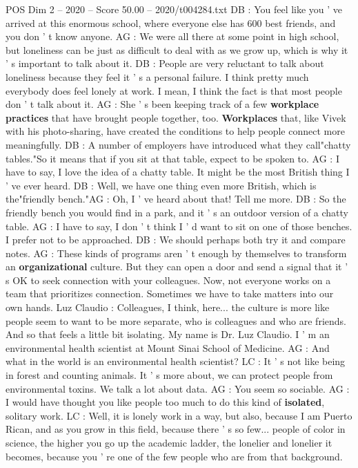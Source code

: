 \begin{textsample}{POS Dim 2 – 2020 – Score 50.00 – 2020/t004284.txt}
DB : You feel like you ' ve arrived at this enormous school, where everyone else has 600 best friends, and you don ' t know anyone.
AG : We were all there at some point in high school, but loneliness can be just as difficult to deal with as we grow up, which is why it ' s important to talk about it.
DB : People are very reluctant to talk about loneliness because they feel it ' s a personal failure.
I think pretty much everybody does feel lonely at work.
I mean, I think the fact is that most people don ' t talk about it.
AG : She ' s been keeping track of a few \textbf{workplace} \textbf{practices} that have brought people together, too. \textbf{Workplaces} that, like Vivek with his photo-sharing, have created the conditions to help people connect more meaningfully.
DB : A number of employers have introduced what they call"chatty tables."So it means that if you sit at that table, expect to be spoken to.
AG : I have to say, I love the idea of a chatty table.
It might be the most British thing I ' ve ever heard.
DB : Well, we have one thing even more British, which is the"friendly bench."AG : Oh, I ' ve heard about that!
Tell me more.
DB : So the friendly bench you would find in a park, and it ' s an outdoor version of a chatty table.
AG : I have to say, I don ' t think I ' d want to sit on one of those benches.
I prefer not to be approached.
DB : We should perhaps both try it and compare notes.
AG : These kinds of programs aren ' t enough by themselves to transform an \textbf{organizational} culture.
But they can open a door and send a signal that it ' s OK to seek connection with your colleagues.
Now, not everyone works on a team that prioritizes connection.
Sometimes we have to take matters into our own hands.
Luz Claudio : Colleagues, I think, here... the culture is more like people seem to want to be more separate, who is colleagues and who are friends.
And so that feels a little bit isolating.
My name is Dr.
Luz Claudio.
I ' m an environmental health scientist at Mount Sinai School of Medicine.
AG : And what in the world is an environmental health scientist?
LC : It ' s not like being in forest and counting animals.
It ' s more about, we can protect people from environmental toxins.
We talk a lot about data.
AG : You seem so sociable.
AG : I would have thought you like people too much to do this kind of \textbf{isolated}, solitary work.
LC : Well, it is lonely work in a way, but also, because I am Puerto Rican, and as you grow in this field, because there ' s so few... people of color in science, the higher you go up the academic ladder, the lonelier and lonelier it becomes, because you ' re one of the few people who are from that background.

\end{textsample}
